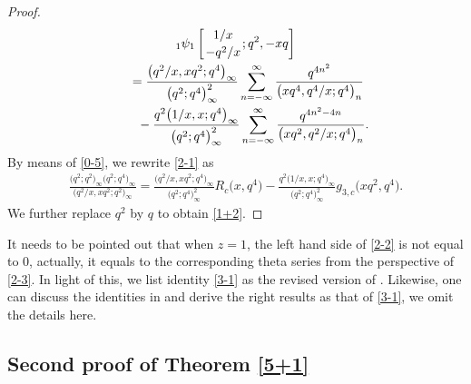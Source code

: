 \documentclass[10pt,a4paper]{amsart}
\numberwithin{equation}{section}
\begin{document}
\begin{proof}
\begin{gather}
{_1\psi_1}\left[{1/x \atop -q^2/x};q^2,-xq\right]\nonumber\\
\qquad=\frac{\bigl(q^2/x,xq^2;q^4\bigr)_{\infty}}{\bigl(q^2;q^4\bigr)_{\infty}^2}
\sum_{n=-\infty}^{\infty}\frac{q^{4n^2}}{\bigl(xq^4,q^4/x;q^4\bigr)_n}\nonumber\\
\phantom{\qquad=}{}-\frac{q^2\bigl(1/x,x;q^4\bigr)_{\infty}}{\bigl(q^2;q^4\bigr)_{\infty}^2}
\sum_{n=-\infty}^{\infty}\frac{q^{4n^2-4n}}{\bigl(xq^2,q^2/x;q^4\bigr)_n}.\label{2-1}
\end{gather}
By means of \eqref{0-5}, we rewrite \eqref{2-1} as
\begin{align*}
\frac{\bigl(q^2;q^2\bigr)_{\infty}\bigl(q^2;q^4\bigr)_{\infty}}{\bigl(q^2/x,xq^2;q^2\bigr)_{\infty}}
=\frac{\bigl(q^2/x,xq^2;q^4\bigr)_{\infty}}{\bigl(q^2;q^4\bigr)_{\infty}^2}R_c\bigl(x,q^4\bigr)
-\frac{q^2\bigl(1/x,x;q^4\bigr)_{\infty}}{\bigl(q^2;q^4\bigr)_{\infty}^2}g_{3,c}\bigl(xq^2,q^4\bigr).
\end{align*}
We further replace $q^2$ by $q$ to obtain \eqref{1+2}.
\end{proof}




\begin{Remark}
It needs to be pointed out that when $z=1$, the left hand side of \eqref{2-2} is not equal to $0$, actually, it equals to the corresponding theta series from the perspective of \eqref{2-3}. In light of this, we list identity \eqref{3-1} as the revised version of \cite[Corollary 2.4]{HZ}. Likewise, one can discuss the identities in \cite[Corollaries 2.6--2.9]{HZ} and derive the right results as that of \eqref{3-1}, we omit the details here.
\end{Remark}

\subsection[Second proof of Theorem 2.6]{Second proof of Theorem \ref{5+1}} \label{sec3}
\end{document}
